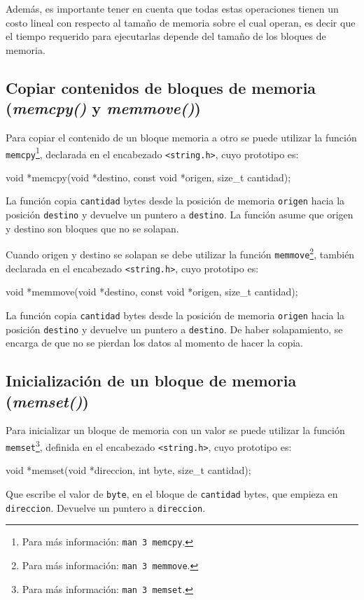 Además, es importante tener en cuenta que todas estas operaciones tienen un
costo lineal con respecto al tamaño de memoria sobre el cual operan, es decir
que el tiempo requerido para ejecutarlas depende del tamaño de los bloques de
memoria.

\subsection{Copiar contenidos de bloques de memoria (\textit{memcpy()} y
\textit{memmove()})}

Para copiar el contenido de un bloque memoria a otro se puede utilizar la
función \lstinline!memcpy!\footnote{Para más información: \texttt{man 3
memcpy}.}, declarada en el encabezado \lstinline!<string.h>!, cuyo prototipo
es:

\begin{codigo-c-plano}
void *memcpy(void *destino, const void *origen, size_t cantidad);
\end{codigo-c-plano}

La función copia \lstinline!cantidad! bytes desde la posición de memoria
\lstinline!origen! hacia la posición \lstinline!destino! y devuelve un puntero
a \lstinline!destino!. La función asume que origen y destino son bloques que
no se solapan.

Cuando origen y destino se solapan se debe utilizar la función
\lstinline!memmove!\footnote{Para más información: \texttt{man 3 memmove}.},
también declarada en el encabezado \lstinline!<string.h>!, cuyo prototipo es:

\begin{codigo-c-plano}
void *memmove(void *destino, const void *origen, size_t cantidad);
\end{codigo-c-plano}

La función copia \lstinline!cantidad! bytes desde la posición de memoria
\lstinline!origen! hacia la posición \lstinline!destino! y devuelve un puntero
a \lstinline!destino!. De haber solapamiento, se encarga de que no se pierdan
los datos al momento de hacer la copia.

\subsection{Inicialización de un bloque de memoria (\textit{memset()})}

Para inicializar un bloque de memoria con un valor se puede utilizar la
función \lstinline!memset!\footnote{Para más información: \texttt{man 3
memset}.}, definida en el encabezado \lstinline!<string.h>!, cuyo prototipo
es:

\begin{codigo-c-plano}
void *memset(void *direccion, int byte, size_t cantidad);
\end{codigo-c-plano}

Que escribe el valor de \lstinline!byte!, en el bloque de 
\lstinline!cantidad! bytes, que empieza en \lstinline!direccion!.  Devuelve un
puntero a \lstinline!direccion!.

